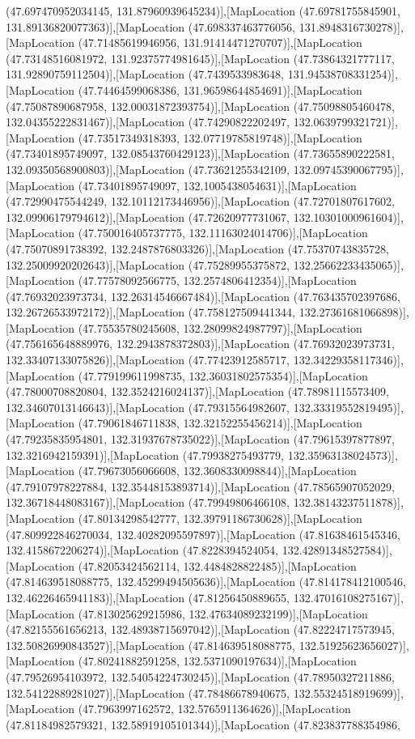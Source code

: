 (47.697470952034145, 131.87960939645234)],[MapLocation (47.69781755845901, 131.89136820077363)],[MapLocation (47.698337463776056, 131.8948316730278)],[MapLocation (47.71485619946956, 131.91414471270707)],[MapLocation (47.73148516081972, 131.92375774981645)],[MapLocation (47.73864321777117, 131.92890759112504)],[MapLocation (47.7439533983648, 131.94538708331254)],[MapLocation (47.74464599068386, 131.96598644854691)],[MapLocation (47.75087890687958, 132.00031872393754)],[MapLocation (47.75098805460478, 132.04355222831467)],[MapLocation (47.74290822202497, 132.0639799321721)],[MapLocation (47.73517349318393, 132.07719785819748)],[MapLocation (47.73401895749097, 132.08543760429123)],[MapLocation (47.73655890222581, 132.09350568900803)],[MapLocation (47.73621255342109, 132.09745390067795)],[MapLocation (47.73401895749097, 132.1005438054631)],[MapLocation (47.72990475544249, 132.10112173446956)],[MapLocation (47.72701807617602, 132.09906179794612)],[MapLocation (47.72620977731067, 132.10301000961604)],[MapLocation (47.750016405737775, 132.11163024014706)],[MapLocation (47.75070891738392, 132.2487876803326)],[MapLocation (47.75370743835728, 132.25009920202643)],[MapLocation (47.75289955375872, 132.25662233435065)],[MapLocation (47.77578092566775, 132.2574806412354)],[MapLocation (47.76932023973734, 132.26314546667484)],[MapLocation (47.763435702397686, 132.26726533972172)],[MapLocation (47.758127509441344, 132.27361681066898)],[MapLocation (47.75535780245608, 132.28099824987797)],[MapLocation (47.756165648889976, 132.2943878372803)],[MapLocation (47.76932023973731, 132.33407133075826)],[MapLocation (47.77423912585717, 132.34229358117346)],[MapLocation (47.779199611998735, 132.36031802575354)],[MapLocation (47.78000708820804, 132.3524216024137)],[MapLocation (47.78981115573409, 132.34607013146643)],[MapLocation (47.79315564982607, 132.33319552819495)],[MapLocation (47.79061846711838, 132.32152255456214)],[MapLocation (47.79235835954801, 132.31937678735022)],[MapLocation (47.79615397877897, 132.3216942159391)],[MapLocation (47.79938275493779, 132.35963138024573)],[MapLocation (47.79673056066608, 132.3608330098844)],[MapLocation (47.79107978227884, 132.35448153893714)],[MapLocation (47.78565907052029, 132.36718448083167)],[MapLocation (47.79949806466108, 132.38143237511878)],[MapLocation (47.80134298542777, 132.39791186730628)],[MapLocation (47.809922846270034, 132.40282095597897)],[MapLocation (47.81638461545346, 132.4158672206274)],[MapLocation (47.8228394524054, 132.42891348527584)],[MapLocation (47.82053424562114, 132.4484828822485)],[MapLocation (47.814639518088775, 132.45299494505636)],[MapLocation (47.814178412100546, 132.46226465941183)],[MapLocation (47.81256450889655, 132.47016108275167)],[MapLocation (47.813025629215986, 132.47634089232199)],[MapLocation (47.82155561656213, 132.48938715697042)],[MapLocation (47.82224717573945, 132.50826990843527)],[MapLocation (47.814639518088775, 132.51925623656027)],[MapLocation (47.80241882591258, 132.5371090197634)],[MapLocation (47.79526954103972, 132.54054224730245)],[MapLocation (47.78950327211886, 132.54122889281027)],[MapLocation (47.78486678940675, 132.55324518919699)],[MapLocation (47.7963997162572, 132.5765911364626)],[MapLocation (47.81184982579321, 132.58919105101344)],[MapLocation (47.823837788354986, 
